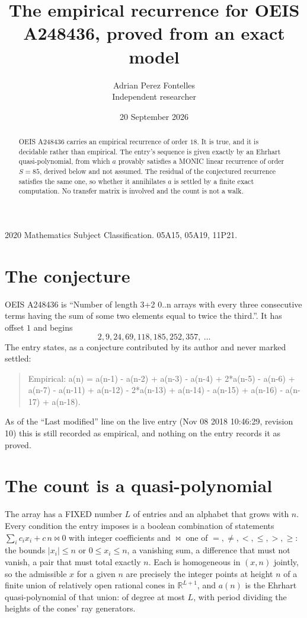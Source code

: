 \documentclass[11pt,a4paper]{article}
\title{The empirical recurrence for OEIS A248436, proved from an exact model}
\author{Adrian Perez Fontelles\\ \small Independent researcher}
\date{20 September 2026}
\theoremstyle{plain}
\theoremstyle{definition}
\begin{document}
\maketitle

\begin{abstract}
OEIS A248436 carries an empirical recurrence of order $18$. It is true, and it is
decidable rather than empirical. The entry's sequence is given exactly by an Ehrhart quasi-polynomial, from
which $a$ provably satisfies a MONIC linear recurrence of order $S=85$, derived below and not
assumed. The residual of the conjectured recurrence satisfies the same one, so whether it
annihilates $a$ is settled by a finite exact computation. No transfer matrix is involved and the count is not a walk.
\end{abstract}

\noindent\small 2020 Mathematics Subject Classification. 05A15, 05A19, 11P21.\normalsize

\section{The conjecture}

OEIS A248436 is ``Number of length 3+2 0..n arrays with every three consecutive terms having the sum of some two elements equal to twice the third.''. It has offset $1$ and begins
\[
2, 9, 24, 69, 118, 185, 252, 357,\ \dots
\]
The entry states, as a conjecture contributed by its author and never marked settled:
\begin{quote}
Empirical: a(n) = a(n-1) - a(n-2) + a(n-3) - a(n-4) + 2*a(n-5) - a(n-6) + a(n-7) - a(n-11) + a(n-12) - 2*a(n-13) + a(n-14) - a(n-15) + a(n-16) - a(n-17) + a(n-18).
\end{quote}
As of the ``Last modified'' line on the live entry (Nov 08 2018 10:46:29, revision 10)
this is still recorded as empirical, and nothing on the entry records it as proved.

\section{The count is a quasi-polynomial}

The array has a FIXED number $L$ of entries and an alphabet that grows with $n$. Every
condition the entry imposes is a boolean combination of statements
$\sum_i c_ix_i + c\,n \bowtie 0$ with integer coefficients and $\bowtie$ one of
$=,\ne,<,\le,>,\ge$: the bounds $|x_i|\le n$ or $0\le x_i\le n$, a vanishing sum, a difference
that must not vanish, a pair that must total exactly $n$. Each is homogeneous in $(x,n)$
jointly, so the admissible $x$ for a given $n$ are precisely the integer points at height $n$
of a finite union of relatively open rational cones in $\mathbb{R}^{L+1}$, and $a(n)$ is
the Ehrhart quasi-polynomial of that union: of degree at most $L$, with period dividing the
heights of the cones' ray generators.
\end{document}
